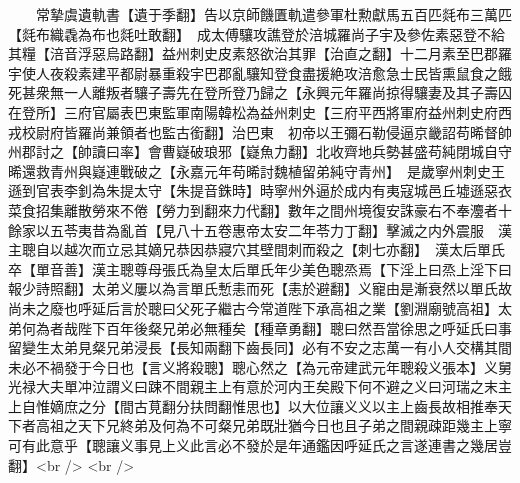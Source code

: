 　　常摯虞遺軌書【遺于季翻】告以京師饑匱軌遣參軍杜勲獻馬五百匹㲜布三萬匹【㲜布織毳為布也㲜吐敢翻】　成太傅驤攻譙登於涪城羅尚子宇及參佐素惡登不給其糧【涪音浮惡烏路翻】益州刺史皮素怒欲治其罪【治直之翻】十二月素至巴郡羅宇使人夜殺素建平都尉暴重殺宇巴郡亂驤知登食盡援絶攻涪愈急士民皆熏鼠食之餓死甚衆無一人離叛者驤子壽先在登所登乃歸之【永興元年羅尚掠得驤妻及其子壽囚在登所】三府官屬表巴東監軍南陽韓松為益州刺史【三府平西將軍府益州刺史府西戎校尉府皆羅尚兼領者也監古銜翻】治巴東　初帝以王彌石勒侵逼京畿詔苟晞督帥州郡討之【帥讀曰率】會曹嶷破琅邪【嶷魚力翻】北收齊地兵勢甚盛苟純閉城自守晞還救青州與嶷連戰破之【永嘉元年苟晞討魏植留弟純守青州】　是歲寧州刺史王遜到官表李釗為朱提太守【朱提音銖時】時寧州外逼於成内有夷寇城邑丘墟遜惡衣菜食招集離散勞來不倦【勞力到翻來力代翻】數年之間州境復安誅豪右不奉灋者十餘家以五苓夷昔為亂首【見八十五卷惠帝太安二年苓力丁翻】擊滅之内外震服　漢主聰自以越次而立忌其嫡兄恭因恭寢穴其壁間刺而殺之【刺七亦翻】　漢太后單氏卒【單音善】漢主聰尊母張氏為皇太后單氏年少美色聰烝焉【下淫上曰烝上淫下曰報少詩照翻】太弟义屢以為言單氏慙恚而死【恚於避翻】义寵由是漸衰然以單氏故尚未之廢也呼延后言於聰曰父死子繼古今常道陛下承高祖之業【劉淵廟號高祖】太弟何為者哉陛下百年後粲兄弟必無種矣【種章勇翻】聰曰然吾當徐思之呼延氏曰事留變生太弟見粲兄弟浸長【長知兩翻下齒長同】必有不安之志萬一有小人交構其間未必不禍發于今日也【言义將殺聰】聰心然之【為元帝建武元年聰殺义張本】义舅光禄大夫單冲泣謂义曰踈不間親主上有意於河内王矣殿下何不避之义曰河瑞之末主上自惟嫡庶之分【間古莧翻分扶問翻惟思也】以大位讓义义以主上齒長故相推奉天下者高祖之天下兄終弟及何為不可粲兄弟既壯猶今日也且子弟之間親疎距幾主上寧可有此意乎【聰讓义事見上义此言必不發於是年通鑑因呼延氏之言遂連書之幾居豈翻】<br />
<br />
